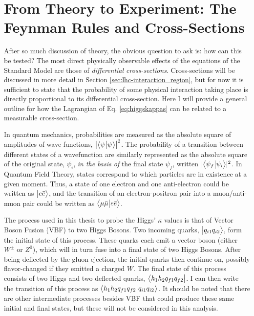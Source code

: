 \section{From Theory to Experiment: The Feynman Rules and Cross-Sections} \label{sec:feyn_rules}
    
    After so much discussion of theory, the obvious question to ask is: how can this be tested?
    The most direct physically observable effects of the equations of the Standard Model are those of \textit{differential cross-sections}.
    Cross-sections will be discussed in more detail in Section \ref{sec:lhc-interaction_region},
        but for now it is sufficient to state that the probability of some physical interaction taking place
        is directly proportional to its differential cross-section.
    Here I will provide a general outline for how the Lagrangian of Eq. \ref{eq:higgskappas} can be related to a measurable cross-section.

    In quantum mechanics, probabilities are measured as the absolute square of amplitudes of wave functions, $\left|\big< \psi \big| \psi \big>\right|^2$.
    The probability of a transition between different states of a wavefunction are similarly represented
        as the absolute square of the original state, $\psi_i$, \textit{in the basis of} the final state $\psi_f$,
        written $ |\big< \psi_f \big| \psi_i \big>|^2$.
    In Quantum Field Theory, states correspond to which particles are in existence at a given moment.
    Thus, a state of one electron and one anti-electron could be written as $\big| e \bar{e} \big>$,
        and the transition of an electron-positron pair into a muon/anti-muon pair could be written
        as $\big< \mu \bar{\mu} \big| e \bar{e} \big>$.

    The process used in this thesis to probe the Higgs' $\kappa$ values is that of Vector Boson Fusion (VBF) to two Higgs Bosons.
    Two incoming quarks, $\big| q_{i1} q_{i2} \big>$, form the initial state of this process.
    These quarks each emit a vector boson (either $W^{\pm}$ or $Z^0$), 
        which will in turn fuse into a final state of two Higgs Bosons.
    After being deflected by the gluon ejection, the initial quarks then continue on, possibly flavor-changed if they emitted a charged $W$.
    The final state of this process consists of two Higgs and two deflected quarks, $\big< h_1 h_2 q_{f1} q_{f2} \big|$.
    I can then write the transition of this process as $\big<  h_1 h_2 q_{f1} q_{f2} \big| q_{i1} q_{i2} \big>$.
    It should be noted that there are other intermediate processes besides VBF
        that could produce these same initial and final states, 
        but these will not be considered in this analysis.

